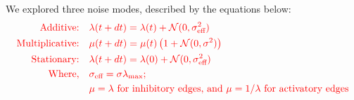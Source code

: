 \documentclass[11pt]{article}
\providecommand{\DIFaddbegin}{} %
\providecommand{\DIFaddend}{} %
\providecommand{\DIFdelbegin}{} %
\providecommand{\DIFdelend}{} %
\providecommand{\DIFaddincludegraphics}[2][]{\DIFOincludegraphics[#1]{#2}} %
\providecommand{\DIFdelincludegraphics}[2][]{}
\DeclareRobustCommand{\DIFaddbegin}{\DIFOaddbegin \let\includegraphics\DIFaddincludegraphics} %
\DeclareRobustCommand{\DIFaddend}{\DIFOaddend \let\includegraphics\DIFOincludegraphics} %
\DeclareRobustCommand{\DIFdelbegin}{\DIFOdelbegin \let\includegraphics\DIFdelincludegraphics} %
\DeclareRobustCommand{\DIFdelend}{\DIFOaddend \let\includegraphics\DIFOincludegraphics} %
\begin{document}
We explored three noise modes, described by the equations below: 
\begin{equation}
\DIFdelbegin %
\DIFdelend \DIFaddbegin \color{red}\begin{aligned}
\text{Additive:} \quad & \lambda(t+dt) = \lambda(t) + \mathcal{N}(0, \sigma_{\text{eff}}^2) \\
\text{Multiplicative:} \quad & \mu(t+dt) = \mu(t)\left(1 + \mathcal{N}(0, \sigma^2)\right) \\
\text{Stationary:} \quad & \lambda(t+dt) = \lambda(0) + \mathcal{N}(0, \sigma_{\text{eff}}^2) \\
\text{Where,} \quad & \sigma_{\text{eff}} = \sigma\lambda_{\text{max}}\text{;} \\
& \mu = \lambda \text{ for inhibitory edges, and } \mu = 1/\lambda \text{ for activatory edges}
\end{aligned}\DIFaddend 
\label{eq:lambda}
\end{equation}
\end{document}
